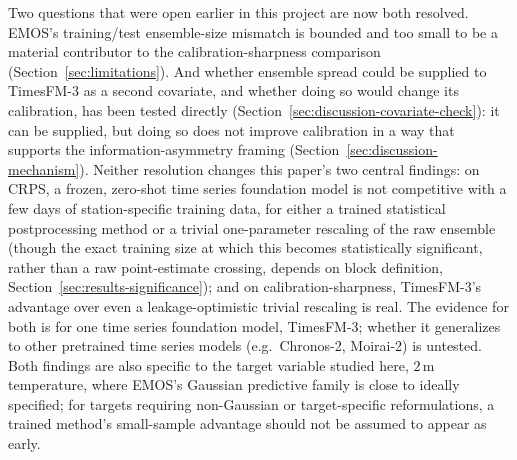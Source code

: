 Two questions that were open earlier in this project are now both
resolved. EMOS's training/test ensemble-size mismatch is bounded and too
small to be a material contributor to the calibration-sharpness
comparison (Section~\ref{sec:limitations}). And whether ensemble spread
could be supplied to TimesFM-3 as a second covariate, and whether doing
so would change its calibration, has been tested directly
(Section~\ref{sec:discussion-covariate-check}): it can be supplied, but
doing so does not improve calibration in a way that supports the
information-asymmetry framing (Section~\ref{sec:discussion-mechanism}).
Neither resolution changes this paper's two central findings: on CRPS, a
frozen, zero-shot time series foundation model is
not competitive with a few days of station-specific training data, for
either a trained statistical postprocessing method or a trivial
one-parameter rescaling of the raw ensemble (though the exact training
size at which this becomes statistically significant, rather than a raw
point-estimate crossing, depends on block definition,
Section~\ref{sec:results-significance}); and on calibration-sharpness,
TimesFM-3's advantage over even a leakage-optimistic trivial rescaling is
real. The evidence for both is for one time series foundation model,
TimesFM-3; whether it generalizes to other pretrained time series models
(e.g.\ Chronos-2, Moirai-2) is untested. Both findings are also specific
to the target variable studied here, \(2\,\mathrm{m}\) temperature, where
EMOS's Gaussian predictive family is close to ideally specified; for
targets requiring non-Gaussian or target-specific reformulations, a
trained method's small-sample advantage should not be assumed to appear
as early.
